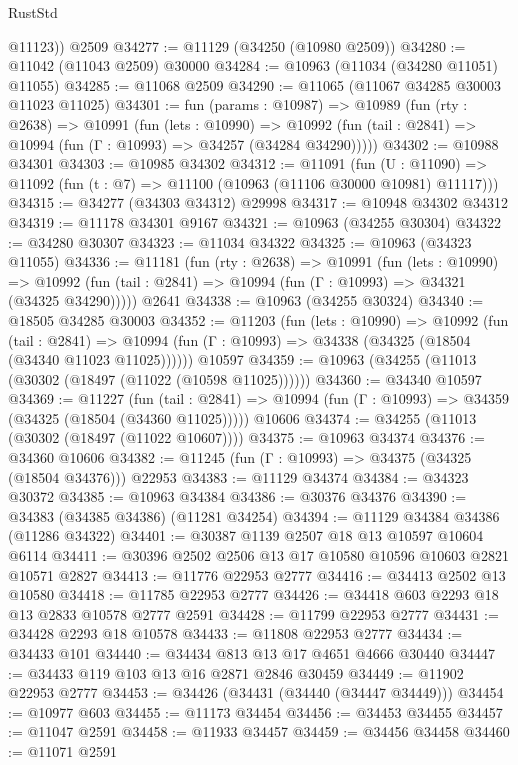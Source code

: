 \begin{lexlean}{RustStd}
\begin{coremodule}
        @11123))
    @2509
@34277 := @11129 (@34250 (@10980 @2509))
@34280 := @11042 (@11043 @2509) @30000
@34284 := @10963 (@11034 (@34280 @11051) @11055)
@34285 := @11068 @2509
@34290 := @11065 (@11067 @34285 @30003 @11023 @11025)
@34301 := fun (params : @10987) =>
  @10989
    (fun (rty : @2638) =>
    @10991
      (fun (lets : @10990) =>
      @10992 (fun (tail : @2841) => @10994 (fun (Γ : @10993) => @34257 (@34284 @34290)))))
@34302 := @10988 @34301
@34303 := @10985 @34302
@34312 := @11091
    (fun (U : @11090) => @11092 (fun (t : @7) => @11100 (@10963 (@11106 @30000 @10981) @11117)))
@34315 := @34277 (@34303 @34312) @29998
@34317 := @10948 @34302 @34312
@34319 := @11178 @34301 @9167
@34321 := @10963 (@34255 @30304)
@34322 := @34280 @30307
@34323 := @11034 @34322
@34325 := @10963 (@34323 @11055)
@34336 := @11181
    (fun (rty : @2638) =>
    @10991
      (fun (lets : @10990) =>
      @10992 (fun (tail : @2841) => @10994 (fun (Γ : @10993) => @34321 (@34325 @34290)))))
    @2641
@34338 := @10963 (@34255 @30324)
@34340 := @18505 @34285 @30003
@34352 := @11203
    (fun (lets : @10990) =>
    @10992
      (fun (tail : @2841) =>
      @10994 (fun (Γ : @10993) => @34338 (@34325 (@18504 (@34340 @11023 @11025))))))
    @10597
@34359 := @10963 (@34255 (@11013 (@30302 (@18497 (@11022 (@10598 @11025))))))
@34360 := @34340 @10597
@34369 := @11227
    (fun (tail : @2841) => @10994 (fun (Γ : @10993) => @34359 (@34325 (@18504 (@34360 @11025)))))
    @10606
@34374 := @34255 (@11013 (@30302 (@18497 (@11022 @10607))))
@34375 := @10963 @34374
@34376 := @34360 @10606
@34382 := @11245 (fun (Γ : @10993) => @34375 (@34325 (@18504 @34376))) @22953
@34383 := @11129 @34374
@34384 := @34323 @30372
@34385 := @10963 @34384
@34386 := @30376 @34376
@34390 := @34383 (@34385 @34386) (@11281 @34254)
@34394 := @11129 @34384 @34386 (@11286 @34322)
@34401 := @30387 @1139 @2507 @18 @13 @10597 @10604 @6114
@34411 := @30396 @2502 @2506 @13 @17 @10580 @10596 @10603 @2821 @10571 @2827
@34413 := @11776 @22953 @2777
@34416 := @34413 @2502 @13 @10580
@34418 := @11785 @22953 @2777
@34426 := @34418 @603 @2293 @18 @13 @2833 @10578 @2777 @2591
@34428 := @11799 @22953 @2777
@34431 := @34428 @2293 @18 @10578
@34433 := @11808 @22953 @2777
@34434 := @34433 @101
@34440 := @34434 @813 @13 @17 @4651 @4666 @30440
@34447 := @34433 @119 @103 @13 @16 @2871 @2846 @30459
@34449 := @11902 @22953 @2777
@34453 := @34426 (@34431 (@34440 (@34447 @34449)))
@34454 := @10977 @603
@34455 := @11173 @34454
@34456 := @34453 @34455
@34457 := @11047 @2591
@34458 := @11933 @34457
@34459 := @34456 @34458
@34460 := @11071 @2591

\end{coremodule}
\end{lexlean}
